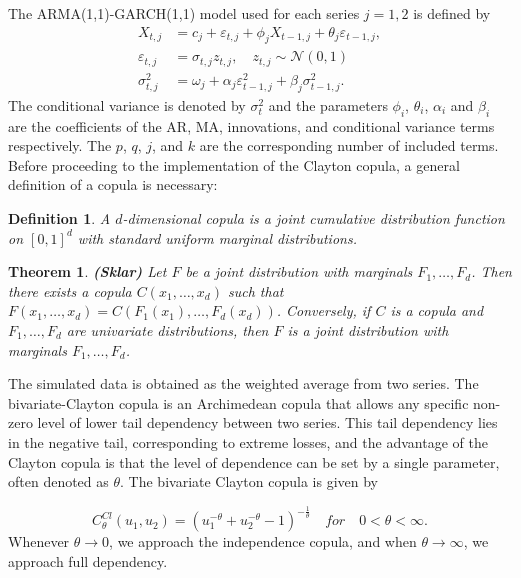 \documentclass[a4paper,12pt]{article}
\theoremstyle{plain}
\newtheorem{thm}{Theorem}
\newtheorem{mydef}{Definition}
\begin{document}
The ARMA(1,1)-GARCH(1,1) model used for each series $j=1,2$ is defined by
\begin{equation}
    \begin{split}
        X_{t,j} &= c_j + \varepsilon_{t,j} + \phi_jX_{t-1,j} + \theta_j\varepsilon_{t-1,j},\\ \varepsilon_{t,j} &= \sigma_{t,j}z_{t,j}, \quad z_{t,j} \sim \mathcal{N}\left(0, 1\right)\\
        \sigma^2_{t,j} &= \omega_j + \alpha_j\varepsilon_{t-1,j}^2 + \beta_j\sigma_{t-1,j}^2.
    \end{split}
    \label{eq:armagarchdef}
\end{equation}
The conditional variance is denoted by $\sigma^2_t$ and the parameters $\phi_i$, $\theta_i$, $\alpha_i$ and $\beta_i$ are the coefficients of the AR, MA, innovations, and conditional variance terms respectively. The $p$, $q$, $j$, and $k$ are the corresponding number of included terms.\\

Before proceeding to the implementation of the Clayton copula, a general definition of a copula is necessary: 


\begin{mydef}
A $d$-dimensional copula is a joint cumulative distribution function on $\left[0, 1\right]^d$ with standard uniform marginal distributions.
\end{mydef}

\begin{thm}{\textbf{(Sklar)}}
    Let $F$ be a joint distribution with marginals $F_1,\dots,F_d$. Then there exists a copula $C(x_1,\dots,x_d)$ such that $F(x_1,\dots,x_d)=C(F_1(x_1),\dots,F_d(x_d))$. Conversely, if $C$ is a copula and $F_1,\dots,F_d$ are univariate distributions, then $F$ is a joint distribution with marginals $F_1,\dots,F_d$.
\end{thm}

The simulated data is obtained as the weighted average from two series. The bivariate-Clayton copula is an Archimedean copula that allows any specific non-zero level of lower tail dependency between two series. This tail dependency lies in the negative tail, corresponding to extreme losses, and the advantage of the Clayton copula is that the level of dependence can be set by a single parameter, often denoted as $\theta$. The bivariate Clayton copula is given by

\begin{equation}
    C_\theta^{Cl}\left(u_1,u_2\right) = \left(u_1^{-\theta} + u_2^{-\theta} - 1\right)^{-\frac{1}{\theta}} \quad for \quad 0<\theta<\infty.
\end{equation}
Whenever $\theta \to 0$, we approach the independence copula, and when $\theta \to \infty$, we approach full dependency.\\
\end{document}
